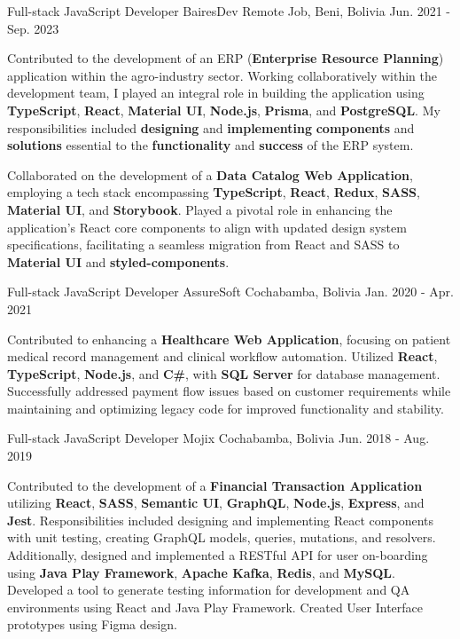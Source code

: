\begin{cventries}
\cventry
    {Full-stack JavaScript Developer}
    {BairesDev}
    {Remote Job, Beni, Bolivia}
    {Jun. 2021 - Sep. 2023}
    {
      \begin{cvitems} 
        \item { Contributed to the development of an ERP (\textbf{Enterprise Resource Planning}) application within the agro-industry sector. Working collaboratively within the development team, I played an integral role in building the application using \textbf{TypeScript}, \textbf{React}, \textbf{Material UI}, \textbf{Node.js}, \textbf{Prisma}, and \textbf{PostgreSQL}. My responsibilities included \textbf{designing} and \textbf{implementing}  \textbf{components} and \textbf{solutions} essential to the \textbf{functionality} and \textbf{success} of the ERP system.}
        \item {Collaborated on the development of a \textbf{Data Catalog Web Application}, employing a tech stack encompassing \textbf{TypeScript}, \textbf{React}, \textbf{Redux}, \textbf{SASS}, \textbf{Material UI}, and \textbf{Storybook}. Played a pivotal role in enhancing the application's React core components to align with updated design system specifications, facilitating a seamless migration from React and SASS to \textbf{Material UI} and \textbf{styled-components}.}
      \end{cvitems} 
    }
\cventry
    {Full-stack JavaScript Developer}
    {AssureSoft}
    {Cochabamba, Bolivia}
    {Jan. 2020 - Apr. 2021}
    {
      \begin{cvitems}
        \item {Contributed to enhancing a \textbf{Healthcare Web Application}, focusing on patient medical record management and clinical workflow automation. Utilized \textbf{React}, \textbf{TypeScript}, \textbf{Node.js}, and \textbf{C\#}, with \textbf{SQL Server} for database management. Successfully addressed payment flow issues based on customer requirements while maintaining and optimizing legacy code for improved functionality and stability.}
      \end{cvitems} 
    }
  \cventry
    {Full-stack JavaScript Developer}
    {Mojix}
    {Cochabamba, Bolivia}
    {Jun. 2018 - Aug. 2019}
    {
      \begin{cvitems}
        \item {Contributed to the development of a \textbf{Financial Transaction Application} utilizing \textbf{React}, \textbf{SASS}, \textbf{Semantic UI}, \textbf{GraphQL}, \textbf{Node.js}, \textbf{Express}, and \textbf{Jest}. Responsibilities included designing and implementing React components with unit testing, creating GraphQL models, queries, mutations, and resolvers. Additionally, designed and implemented a RESTful API for user on-boarding using \textbf{Java Play Framework}, \textbf{Apache Kafka}, \textbf{Redis}, and \textbf{MySQL}. Developed a tool to generate testing information for development and QA environments using React and Java Play Framework. Created User Interface prototypes using Figma design.}

\end{cvitems}}
\end{cventries}
